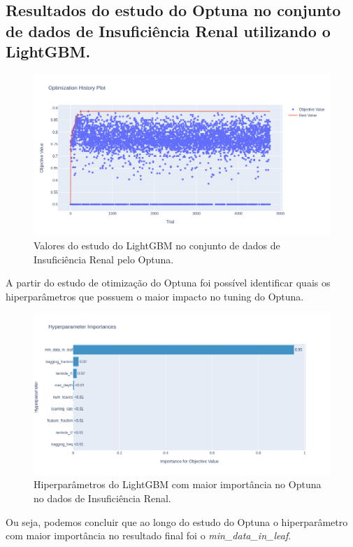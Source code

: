 \subsection{Resultados do estudo do Optuna no conjunto de dados de Insuficiência Renal utilizando o LightGBM.}
\begin{figure}[H]
 \caption{Valores do estudo do LightGBM no conjunto de dados de Insuficiência Renal pelo Optuna.}
 \label{fig:op:kind:trials:lgbm}
 \centering
 \includegraphics[scale=0.4]{images/optuna_lgbm_kikndey.png}
\end{figure}
A partir do estudo de otimização do Optuna foi possível identificar quais os hiperparâmetros que possuem o maior impacto no tuning do Optuna.
\begin{figure}[H]
 \caption{Hiperparâmetros do LightGBM com maior importância no Optuna no dados de Insuficiência Renal.}
 \label{fig:op:kind:impo:lgbm}
 \centering
 \includegraphics[scale=0.4]{images/optuna_lgbm_importance_kindey.png}
\end{figure}
Ou seja, podemos concluir que ao longo do estudo do Optuna o hiperparâmetro com maior importância no resultado final foi o \textit{min\_data\_in\_leaf}.

